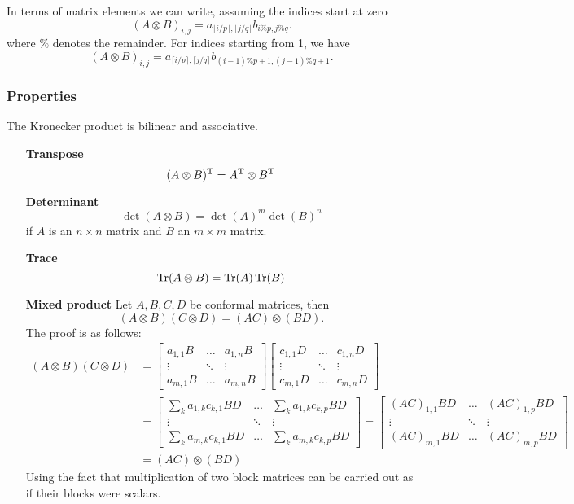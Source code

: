 In terms of matrix elements we can write, assuming the indices start at zero
\[ (A\otimes B)_{i,j} = a_{\lfloor{i/p}\rfloor, \lfloor{j/q}\rfloor}b_{i\%p,j\%q}. \]
where $\%$ denotes the remainder. For indices starting from 1, we have
\[ (A\otimes B)_{i,j} = a_{\lceil{i/p}\rceil, \lceil{j/q}\rceil}b_{(i-1)\%p+1,(j-1)\%q+1}. \]

\subsubsection{Properties}
The Kronecker product is bilinear and associative.
\begin{itemize}
\item[\textbf{Transpose}]
\[ (A\otimes B)^{\mathrm{T}} = A^{\mathrm{T}} \otimes B^{\mathrm{T}} \]
\item[\textbf{Determinant}]
\[ \det(A\otimes B) = \det(A)^m\det(B)^n \]
if $A$ is an $n\times n$ matrix and $B$ an $m\times m$ matrix.
\item[\textbf{Trace}]
\[ \operatorname{Tr}(A\otimes B) = \operatorname{Tr}(A)\operatorname{Tr}(B) \]
\item[\textbf{Mixed product}]
Let $A,B,C,D$ be conformal matrices, then
\[ (A\otimes B)(C \otimes D) = (AC)\otimes (BD). \]
The proof is as follows:
\begin{align}
(A\otimes B)(C \otimes D) &= \begin{bmatrix}
a_{1,1}B & \hdots & a_{1,n}B \\
\vdots & \ddots & \vdots \\
a_{m,1}B & \hdots & a_{m,n}B
\end{bmatrix}\begin{bmatrix}
c_{1,1}D & \hdots & c_{1,n}D \\
\vdots & \ddots & \vdots \\
c_{m,1}D & \hdots & c_{m,n}D
\end{bmatrix} \\
&= \begin{bmatrix}
\sum_k a_{1,k}c_{k,1} BD & \hdots & \sum_k a_{1,k}c_{k,p} BD \\
\vdots & \ddots & \vdots \\
\sum_k a_{m,k}c_{k,1} BD & \hdots & \sum_k a_{m,k}c_{k,p} BD
\end{bmatrix}  =  \begin{bmatrix}
(AC)_{1,1} BD & \hdots & (AC)_{1,p} BD \\
\vdots & \ddots & \vdots \\
(AC)_{m,1} BD & \hdots & (AC)_{m,p} BD
\end{bmatrix}\\
&= (AC)\otimes (BD)
\end{align}
Using the fact that multiplication of two block matrices can be carried out as if their blocks were scalars.


\end{itemize}
